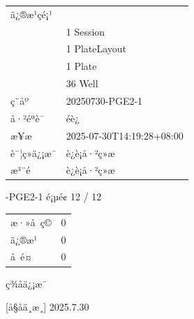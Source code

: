 \documentclass[UTF8,10pt,a4paper,fontset=fandol]{ctexart}
\newcommand{\fieldvalue}[1]{#1}
\newcommand{\handwritten}[1]{#1}
\begin{document}
\begin{tabular}{ll}
\multicolumn{2}{l}{ä¿®æ¹çé¡¹}\\
&
\fieldvalue{1}\quad
\fieldvalue{Session}\\
&
\fieldvalue{1}\quad
\fieldvalue{PlateLayout}\\
&
\fieldvalue{1}\quad
\fieldvalue{Plate}\\
&
\fieldvalue{36}\quad
\fieldvalue{Well}\\[2pt]

ç¨åº &
\fieldvalue{20250730-PGE2-1}\\
å·²éªè¯ &
\fieldvalue{éè¿}\\
æ¥æ &
\fieldvalue{2025-07-30T14:19:28+08:00}\\
è¯¦ç»ä¿¡æ¯ &
\fieldvalue{è¿è¡å·²ç»æ}\\
æ³¨é &
\fieldvalue{è¿è¡å·²ç»æ}
\end{tabular}


\newpage

-PGE2-1 \hfill é¡µé¢ 12 / 12

\noindent
\begin{tabular}{ll}
æ·»å ç© & 0 \\
ä¿®æ¹ & 0 \\
å é¤ & 0
\end{tabular}

\medskip

ç­¾åä¿¡æ¯

\vfill

\handwritten{[å§åä¸æ¸]}\quad
\handwritten{2025.7.30}
\end{document}
